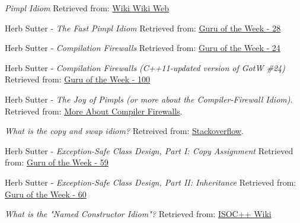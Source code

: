      \emph{Pimpl Idiom}
    \newline
    Retrieved from: \href{http://wiki.c2.com/?PimplIdiom}{Wiki Wiki Web}

     Herb Sutter - \emph{The Fast Pimpl Idiom}
    \newline
    Retrieved from: \href{http://www.gotw.ca/gotw/028.htm}{Guru of the Week - 28}
    
     Herb Sutter - \emph{Compilation Firewalls}
    \newline
    Retrieved from: \href{http://www.gotw.ca/gotw/024.htm}{Guru of the Week - 24}
        
     Herb Sutter - \emph{Compilation Firewalls (C++11-updated version of GotW \#24)} 
    \newline
    Retrieved from: \href{https://herbsutter.com/gotw/_100/}{Guru of the Week - 100}

     Herb Sutter - \emph{The Joy of Pimpls (or more about the Compiler-Firewall Idiom)}. 
    \newline
    Retrieved from: \href{http://www.gotw.ca/publications/mill05.htm}{More About Compiler Firewalls}.
    
     \emph{What is the copy and swap idiom?}
    \newline
    Retreived from: \href{https://stackoverflow.com/questions/3279543/what-is-the-copy-and-swap-idiom}{Stackoverflow}.    

     Herb Sutter - \emph{Exception-Safe Class Design, Part I: Copy Assignment}
    \newline
    Retrieved from: \href{http://gotw.ca/gotw/059.htm}{Guru of the Week - 59}

     Herb Sutter - \emph{Exception-Safe Class Design, Part II: Inheritance}
    \newline
    Retrieved from: \href{http://gotw.ca/gotw/060.htm}{Guru of the Week - 60}

    \emph{What is the "Named Constructor Idiom"?}
    \newline
    Retrieved from: \href{https://isocpp.org/wiki/faq/ctors#named-ctor-idiom}{ISOC++ Wiki}

